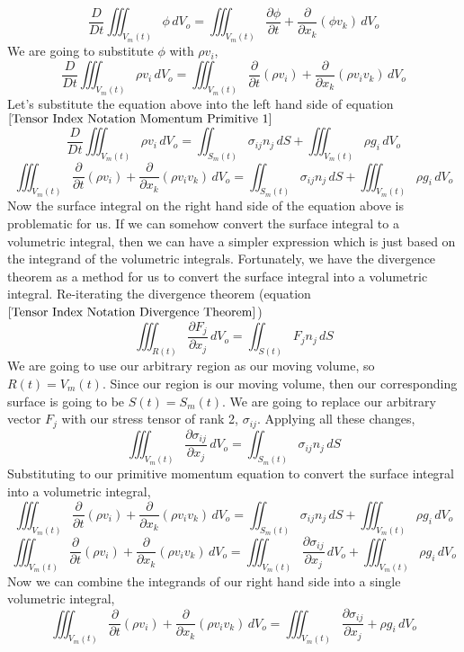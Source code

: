 $$\frac{D}{Dt}\iiint^{}_{V_{m}(t)} \phi \,dV_{o} = \iiint^{}_{V_{m}(t)} \frac{\partial \phi}{\partial t} + \frac{\partial}{\partial x_{k}} (\phi v_{k}) \,dV_{o}$$
We are going to substitute $\phi$ with $\rho v_{i}$,
$$\frac{D}{Dt}\iiint^{}_{V_{m}(t)} \rho v_{i} \,dV_{o} = \iiint^{}_{V_{m}(t)} \frac{\partial }{\partial t}(\rho v_{i}) + \frac{\partial}{\partial x_{k}} (\rho v_{i} v_{k}) \,dV_{o}$$
Let's substitute the equation above into the left hand side of equation $\ref{Tensor Index Notation Momentum Primitive 1}$
$$\frac{D}{Dt}\iiint^{}_{V_{m}(t)} \rho v_{i} \,dV_{o} = \iint^{}_{S_{m}(t)} \sigma_{ij}n_{j} \,dS + \iiint^{}_{V_{m}(t)} \rho g_{i} \,dV_{o} $$
$$\iiint^{}_{V_{m}(t)} \frac{\partial }{\partial t}(\rho v_{i}) + \frac{\partial}{\partial x_{k}} (\rho v_{i} v_{k}) \,dV_{o} = \iint^{}_{S_{m}(t)} \sigma_{ij}n_{j} \,dS + \iiint^{}_{V_{m}(t)} \rho g_{i} \,dV_{o} $$
Now the surface integral on the right hand side of the equation above is problematic for us. 
If we can somehow convert the surface integral to a volumetric integral, then we can have a simpler expression which is just based on the integrand of the volumetric integrals.
Fortunately, we have the divergence theorem as a method for us to convert the surface integral into a volumetric integral.
Re-iterating the divergence theorem (equation $\ref{Tensor Index Notation Divergence Theorem}$)
$$\iiint^{}_{R(t)} \frac{\partial F_{j}}{\partial x_{j}} \,dV_{o} = \iint^{}_{S(t)} F_{j}n_{j} \,dS$$
We are going to use our arbitrary region as our moving volume, so $R(t) = V_{m}(t)$. 
Since our region is our moving volume, then our corresponding surface is going to be $S(t) = S_{m}(t)$.
We are going to replace our arbitrary vector $F_{j}$ with our stress tensor of rank 2, $\sigma_{ij}$.
Applying all these changes,
$$\iiint^{}_{V_{m}(t)} \frac{\partial \sigma_{ij}}{\partial x_{j}} \,dV_{o} = \iint^{}_{S_{m}(t)} \sigma_{ij}n_{j} \,dS$$
Substituting to our primitive momentum equation to convert the surface integral into a volumetric integral,
$$\iiint^{}_{V_{m}(t)} \frac{\partial }{\partial t}(\rho v_{i}) + \frac{\partial}{\partial x_{k}} (\rho v_{i} v_{k}) \,dV_{o} = \iint^{}_{S_{m}(t)} \sigma_{ij}n_{j} \,dS + \iiint^{}_{V_{m}(t)} \rho g_{i} \,dV_{o} $$
$$\iiint^{}_{V_{m}(t)} \frac{\partial }{\partial t}(\rho v_{i}) + \frac{\partial}{\partial x_{k}} (\rho v_{i} v_{k}) \,dV_{o} = \iiint^{}_{V_{m}(t)} \frac{\partial \sigma_{ij}}{\partial x_{j}} \,dV_{o} + \iiint^{}_{V_{m}(t)} \rho g_{i} \,dV_{o} $$
Now we can combine the integrands of our right hand side into a single volumetric integral,
$$\iiint^{}_{V_{m}(t)} \frac{\partial }{\partial t}(\rho v_{i}) + \frac{\partial}{\partial x_{k}} (\rho v_{i} v_{k}) \,dV_{o} = \iiint^{}_{V_{m}(t)} \frac{\partial \sigma_{ij}}{\partial x_{j}}  +  \rho g_{i} \,dV_{o} $$
